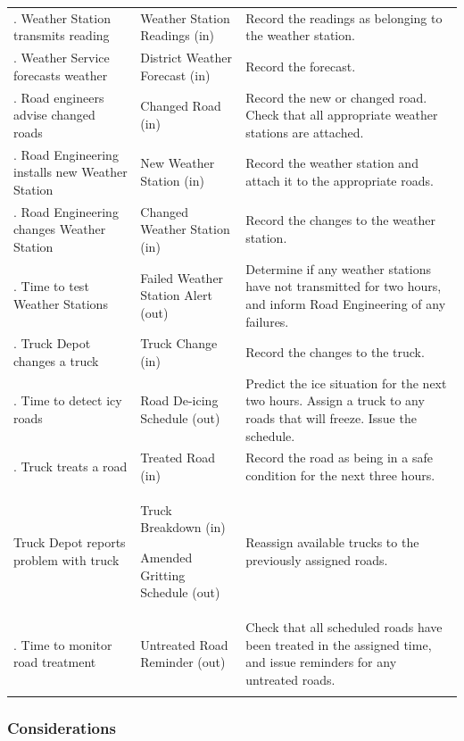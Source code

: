 \documentclass[
]{article}
\begin{document}
\begin{longtable}[]{@{}
  >{\raggedright\arraybackslash}p{}
  >{\raggedright\arraybackslash}p{}
  >{\raggedright\arraybackslash}p{}@{}}
\toprule()
\endhead
1. Weather Station transmits reading & Weather Station Readings (in) &
Record the readings as belonging to the weather station. \\
2. Weather Service forecasts weather & District Weather Forecast (in) &
Record the forecast. \\
3. Road engineers advise changed roads & Changed Road (in) & Record the
new or changed road. Check that all appropriate weather stations are
attached. \\
4. Road Engineering installs new Weather Station & New Weather Station
(in) & Record the weather station and attach it to the appropriate
roads. \\
5. Road Engineering changes Weather Station & Changed Weather Station
(in) & Record the changes to the weather station. \\
6. Time to test Weather Stations & Failed Weather Station Alert (out) &
Determine if any weather stations have not transmitted for two hours,
and inform Road Engineering of any failures. \\
7. Truck Depot changes a truck & Truck Change (in) & Record the changes
to the truck. \\
8. Time to detect icy roads & Road De-icing Schedule (out) & Predict the
ice situation for the next two hours. Assign a truck to any roads that
will freeze. Issue the schedule. \\
9. Truck treats a road & Treated Road (in) & Record the road as being in
a safe condition for the next three hours. \\
10 Truck Depot reports problem with truck & Truck Breakdown (in)

Amended Gritting Schedule (out) & Reassign available trucks to the
previously assigned roads. \\
11. Time to monitor road treatment & Untreated Road Reminder (out) &
Check that all scheduled roads have been treated in the assigned time,
and issue reminders for any untreated roads. \\
& & \\
\bottomrule()
\end{longtable}

\hypertarget{considerations-13}{%
\subsubsection{Considerations}\label{considerations-13}}
\end{document}
